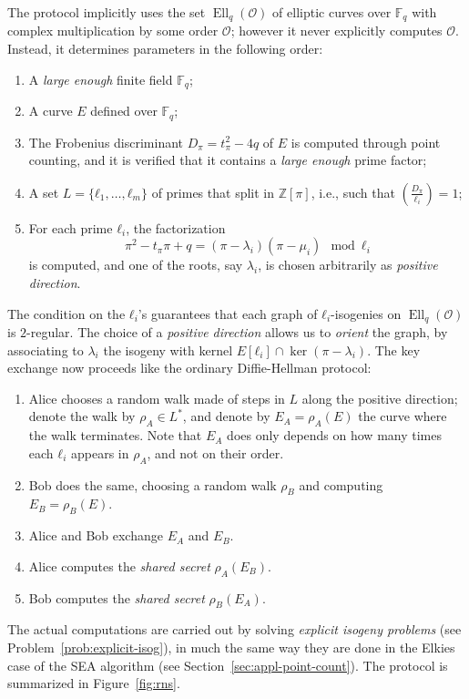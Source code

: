 \documentclass[10pt]{article}
\theoremstyle{plain}
\theoremstyle{definition}
\DeclareMathOperator{\Ell}{Ell}
\def\F{\ensuremath{\mathbb{F}}}
\def\O{\ensuremath{\mathcal{O}}}
\begin{document}
The protocol implicitly uses the set $\Ell_q(\O)$ of elliptic curves
over $\F_q$ with complex multiplication by some order $\O$; however it
never explicitly computes $\O$. %
Instead, it determines parameters in the following order:
\begin{enumerate}
\item A \emph{large enough} finite field $\F_q$;
\item A curve $E$ defined over $\F_q$;
\item The Frobenius discriminant $D_π=t_π^2-4q$ of $E$ is computed
  through point counting, and it is verified that it contains a
  \emph{large enough} prime factor;
\item A set $L=\{ℓ_1,\dots,ℓ_m\}$ of primes that split in $ℤ[π]$,
  i.e., such that $\left(\frac{D_π}{ℓ_i}\right)=1$;
\item For each prime $ℓ_i$, the factorization
  \[π^2-t_ππ+q=(π-λ_i)(π-μ_i)\mod ℓ_i\] %
  is computed, and one of the roots, say $λ_i$, is chosen arbitrarily
  as \emph{positive direction}.
\end{enumerate}

The condition on the $ℓ_i$'s guarantees that each graph of
$ℓ_i$-isogenies on $\Ell_q(\O)$ is $2$-regular. %
The choice of a \emph{positive direction} allows us to \emph{orient}
the graph, by associating to $λ_i$ the isogeny with kernel
$E[ℓ_i]∩\ker(π-λ_i)$. %
The key exchange now proceeds like the ordinary Diffie-Hellman
protocol:
\begin{enumerate}
\item Alice chooses a random walk made of steps in $L$ along the
  positive direction; denote the walk by $ρ_A∈L^*$, and denote by
  $E_A=ρ_A(E)$ the curve where the walk terminates. %
  Note that $E_A$ does only depends on how many times each $ℓ_i$
  appears in $ρ_A$, and not on their order.
\item Bob does the same, choosing a random walk $ρ_B$ and computing
  $E_B=ρ_B(E)$.
\item Alice and Bob exchange $E_A$ and $E_B$.
\item Alice computes the \emph{shared secret} $ρ_A(E_B)$.
\item Bob computes the \emph{shared secret} $ρ_B(E_A)$.
\end{enumerate}
The actual computations are carried out by solving \emph{explicit
  isogeny problems} (see Problem~\ref{prob:explicit-isog}), in much
the same way they are done in the Elkies case of the SEA algorithm
(see Section~\ref{sec:appl-point-count}). %
The protocol is summarized in Figure~\ref{fig:rns}.
\end{document}
